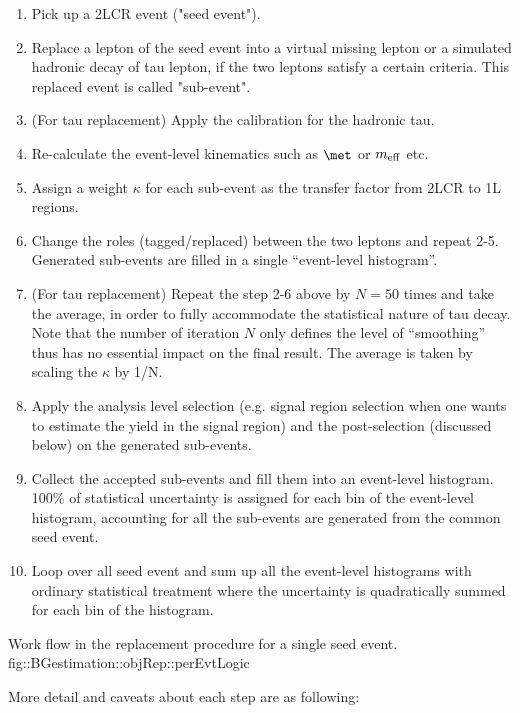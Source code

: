 \begin{enumerate}
\item Pick up a 2LCR event ("seed event").
\item Replace a lepton of the seed event into a virtual missing lepton or a simulated hadronic decay of tau lepton, if the two leptons satisfy a certain criteria. This replaced event is called "sub-event".
\item (For tau replacement) Apply the calibration for the hadronic tau.
\item Re-calculate the event-level kinematics such as $\met$ or $m_{\mathrm{eff}}$ etc.
\item Assign a weight $\kappa$ for each sub-event as the transfer factor from 2LCR to 1L regions.
\item Change the roles (tagged/replaced) between the two leptons and repeat 2-5. Generated sub-events are filled in a single ``event-level histogram''.
\item (For tau replacement) Repeat the step 2-6 above by $N=50$ times and take the average, in order to fully accommodate the statistical nature of tau decay. Note that the number of iteration $N$ only defines the level of ``smoothing'' thus has no essential impact on the final result. The average is taken by scaling the $\kappa$ by 1/N.

\item Apply the analysis level selection (e.g. signal region selection when one wants to estimate the yield in the signal region) and the post-selection (discussed below) on the generated sub-events. 
\item Collect the accepted sub-events and fill them into an event-level histogram. 100$\%$ of statistical uncertainty is assigned for each bin of the event-level histogram, accounting for all the sub-events are generated from the common seed event.
\item Loop over all seed event and sum up all the event-level histograms with ordinary statistical treatment where the uncertainty is quadratically summed for each bin of the histogram. 
\end{enumerate}

{Work flow in the replacement procedure for a single seed event.}
{fig::BGestimation::objRep::perEvtLogic}

More detail and caveats about each step are as following:  \\


